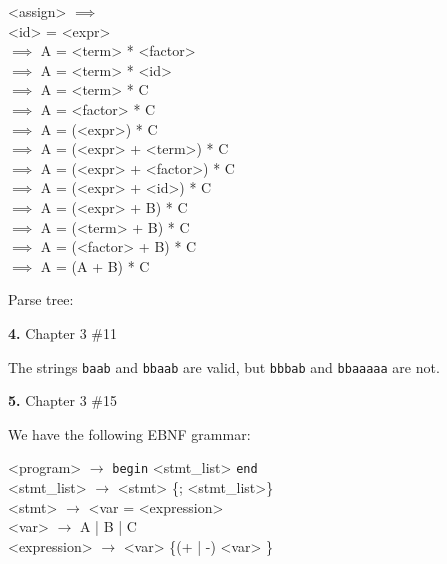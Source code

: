 \documentclass[letterpaper, 11pt]{article}
\newcommand{\hwnumbersec}[2]{\medskip \noindent\textbf{#1.} Chapter 3 \##2 \smallskip}
\newcommand{\To}{$\rightarrow$ }
\begin{document}
\begin{minipage}{0.8\textwidth}
\centering
\begin{grammar}
	<assign> $\implies$\\
	<id> = <expr> \\
	$\implies$ A = <term> * <factor> \\
	$\implies$ A = <term> * <id>\\
	$\implies$ A = <term> * C\\
	$\implies$ A = <factor> * C\\
	$\implies$ A = (<expr>) * C\\
	$\implies$ A = (<expr> + <term>) * C\\
	$\implies$ A = (<expr> + <factor>) * C\\
	$\implies$ A = (<expr> + <id>) * C\\
	$\implies$ A = (<expr> + B) * C\\
	$\implies$ A = (<term> + B) * C\\
	$\implies$ A = (<factor> + B) * C\\
	$\implies$ A = (A + B) * C
\end{grammar}
\end{minipage}

Parse tree:

\hwnumbersec{4}{11}

The strings \texttt{baab} and \texttt{bbaab} are valid, but \texttt{bbbab} and
\texttt{bbaaaaa} are not. 

\hwnumbersec{5}{15}

We have the following EBNF grammar:
\medskip

\begin{minipage}{0.8\textwidth}
\centering
\begin{grammar}
	<program> \To \texttt{begin} <stmt_list> \texttt{end}\\
	<stmt_list> \To <stmt> \{; <stmt_list>\}\\
	<stmt> \To <var = <expression>\\
	<var> \To A | B | C\\
	<expression> \To <var> \{(+ | -) <var> \}
\end{grammar}
\end{minipage}
\end{document}
